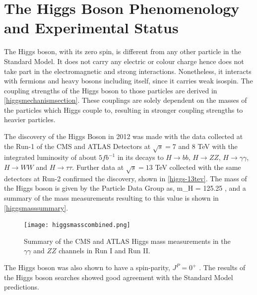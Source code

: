 \section{The Higgs Boson Phenomenology and Experimental Status}

The Higgs boson, with its zero spin, is different from any other particle in the Standard Model. It does not carry any electric or colour charge hence does not take part in the electromagnetic and strong interactions. Nonetheless, it interacts with fermions and heavy bosons including itself, since it carries weak isospin. The coupling strengths of the Higgs boson to those particles are derived in \autoref{higgsmechanismsection}. These couplings are solely dependent on the masses of the particles which Higgs couple to, resulting in stronger coupling strengths to heavier particles\cite{pdg}.

The discovery of the Higgs Boson in 2012 was made with the data collected at the Run-1 of the CMS and ATLAS Detectors at $\sqrt{s} = 7$ and $8$ TeV with the integrated luminosity of about $5 fb^{-1}$ in its decays to $H\rightarrow bb$, $H\rightarrow ZZ$, $H\rightarrow \gamma\gamma$, $H\rightarrow WW$ and $H\rightarrow \tau\tau$. Further data at $\sqrt{s} = 13$ TeV collected with the same detectors at Run-2 confirmed the discovery, shown in \autoref{higgs-13tev}. The mass of the Higgs boson is given by the Particle Data Group\cite{pdg} as,
\be
m_H = 125.25 ,
\ee
and a summary of the mass measurements resulting to this value is shown in \autoref{higgsmasssummary}.

\begin{figure}[ht]
	\centering
	\texttt{[image: higgsmasscombined.png]}
	\caption[Summary of the CMS and ATLAS Higgs mass measurements in the $\gamma\gamma$ and $ZZ$ channels in Run I and Run II.]{Summary of the CMS and ATLAS Higgs mass measurements in the $\gamma\gamma$ and $ZZ$ channels in Run I and Run II\cite{pdg}.}
	\label{higgsmasssummary}
\end{figure}

The Higgs boson was also shown to have a spin-parity, $J^P=0^+$ \cite{higgs-spin}. The results of the Higgs boson searches showed good agreement with the Standard Model predictions. 

